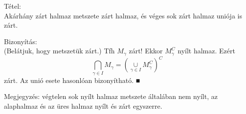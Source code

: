 \documentclass[]{scrartcl}
\newenvironment{tetel}{}{}
\newenvironment{bizonyitas}{}{}
\newenvironment{megjegyzes}{}{}
\begin{document}
\begin{tetel}

Tétel:\\
Akárhány zárt halmaz metszete zárt halmaz, és véges sok zárt halmaz
uniója is zárt.

\end{tetel}

\begin{bizonyitas}

Bizonyítás:\\
(Belátjuk, hogy metszetük zárt.) Tfh \(M_{\gamma}\) zárt! Ekkor
\(M_{\gamma}^{C}\) nyílt halmaz. Ezért
\[{\bigcap\limits_{\gamma \in I}M_{\gamma}} = \left( {\underset{\gamma \in I}{\cup}M_{\gamma}^{C}} \right)^{C}\]
zárt. Az unió esete hasonlóan bizonyítható. ■\\

\end{bizonyitas}

\begin{megjegyzes}

Megjegyzés: végtelen sok nyílt halmaz metszete általában nem nyílt, az
alaphalmaz és az üres halmaz nyílt és zárt egyszerre.

\end{megjegyzes}
\end{document}
